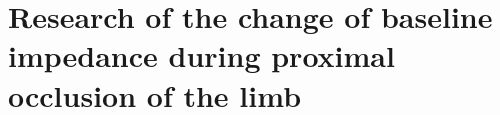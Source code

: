 
\chapter{Research of the change of baseline impedance during proximal occlusion of the limb}  %
\label{chapter occlusion}

\ifpdf
\graphicspath{{Chapter7/Figs/Raster/}{Chapter7/Figs/PDF/}{Chapter7/Figs/}}
\else
\graphicspath{{Chapter7/Figs/Vector/}{Chapter7/Figs/}}
\fi

